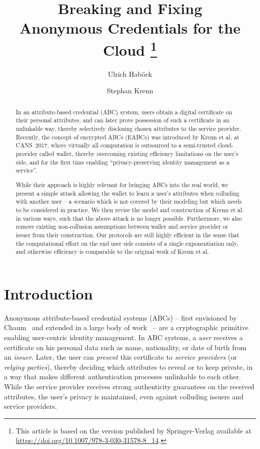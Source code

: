 \documentclass[runningheads]{llncs}
\title{Breaking and Fixing\\ Anonymous Credentials for the Cloud%
\thanks{ This article is based on the version published by Springer-Verlag available at \url{https://doi.org/10.1007/978-3-030-31578-8_14}.}}
\author{Ulrich Hab\"ock\inst{1}\orcidID{0000-0003-0467-9260} \and 
Stephan Krenn\inst{2}\orcidID{0000-0003-2835-9093}}
\institute{University of Applied Sciences FH Campus Wien, Vienna, Austria\\
\email{ulrich.haboeck@fh-campuswien.ac.at}
 \and
AIT Austrian Institute of Technology GmbH, Vienna, Austria\\
\email{stephan.krenn@ait.ac.at}
}
\begin{document}
\maketitle

\begin{abstract}
In an attribute-based credential (ABC) system, users obtain a digital certificate on their personal attributes, and can later prove possession of such a certificate in an unlinkable way, thereby selectively disclosing chosen attributes to the service provider.
Recently, the concept of encrypted ABCs (EABCs) was introduced by Krenn et al. at CANS~2017, where virtually all computation is outsourced to a semi-trusted cloud-provider called wallet, thereby overcoming existing efficiency limitations on the user's side, and for the first time enabling ``privacy-preserving identity management as a service''. 

While their approach is highly relevant for bringing ABCs into the real world, we present a simple attack allowing the wallet to learn a user's attributes when colluding with another user -- a scenario which is not covered by their modeling but which needs to be considered in practice.
We then revise the model and construction of Krenn et al. in various ways, such that the above attack is no longer possible.
Furthermore, we also remove existing non-collusion assumptions between wallet and service provider or issuer from their construction.
 Our protocols are still highly efficient in the sense that the computational effort on the end user side consists of a single exponentiation only, and otherwise efficiency is comparable to the original work of Krenn et al.


\end{abstract}




 


\section{Introduction}
\label{s:Introduction}

Anonymous attribute-based credential systems (ABCs) -- first envisioned by Chaum~\cite{chaum81,chaum85} and extended in a large body of work~\cite{brands99,cdhk15,idemix,camlys01,camlys02,camlys04,fuhasl18,paqzav13,DBLP:conf/fc/RingersVH17,DBLP:conf/acisp/YangAXY18} -- are a cryptographic primitive enabling user-centric identity management.
In ABC systems, a \emph{user} receives a certificate on his personal data such as name, nationality, or date of birth from an \emph{issuer}.
Later, the user can \emph{present} this certificate to \emph{service providers} (or \emph{relying parties}), thereby deciding which attributes to reveal or to keep private, in a way that makes different authentication processes unlinkable to each other.
While the service provider receives strong authenticity guarantees on the received attributes, the user's privacy is maintained, even against colluding issuers and service providers. 
\end{document}
